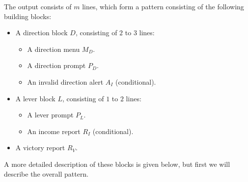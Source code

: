The output consists of $m$ lines,
which form a pattern consisting of the following building blocks:
\begin{itemize}
    \item
    A direction block $D$, consisting of $2$ to $3$ lines:
    \begin{itemize}
        \item
        A direction menu $M_D$.
        \item
        A direction prompt $P_D$.
        \item
        An invalid direction alert $A_I$ (conditional).
    \end{itemize}
    \item
    A lever block $L$, consisting of $1$ to $2$ lines:
    \begin{itemize}
        \item
        A lever prompt $P_L$.
        \item
        An income report $R_I$ (conditional).
    \end{itemize}
    \item
    A victory report $R_V$.
\end{itemize}
A more detailed description of these blocks is given below,
but first we will describe the overall pattern.

